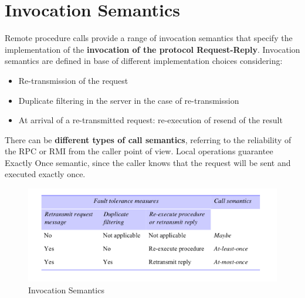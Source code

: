 \section{Invocation Semantics}
Remote procedure calls provide a range of invocation semantics that specify the implementation of the \textbf{invocation of the protocol Request-Reply}. Invocation semantics are defined in base of different implementation choices considering:
\begin{itemize}
    \item Re-transmission of the request
    \item Duplicate filtering in the server in the case of re-transmission
    \item At arrival of a re-transmitted request: re-execution of resend of the result 
\end{itemize}
There can be \textbf{different types of call semantics}, referring to the reliability of the RPC or RMI from the caller point of view. Local operations guarantee Exactly Once semantic, since the caller knows that the request will be sent and executed exactly once.

\begin{figure}[!h]
            \centering
            \includegraphics[width=.7\linewidth]{images/InterprocessCommunication/invocationSemantcs.png}
            \caption{Invocation Semantics}
    \end{figure}

